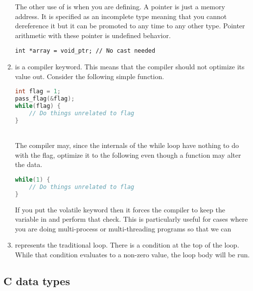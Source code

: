 \begin{enumerate}
	      The other use of  is when you are defining. A  pointer is just a memory address. It is specified as an incomplete type meaning that you cannot dereference it but it can be promoted to any time to any other type. Pointer arithmetic with these pointer is undefined behavior.

	      \begin{lstlisting}[langauge=C]
int *array = void_ptr; // No cast needed
\end{lstlisting}

	\item {} is a compiler keyword. This means that the compiler should not optimize its value out. Consider the following simple function.
	      \\
	      \begin{lstlisting}[language=C]
int flag = 1;
pass_flag(&flag);
while(flag) {
    // Do things unrelated to flag
}
\end{lstlisting}
	      \\
	      The compiler may, since the internals of the while loop have nothing to do with the flag, optimize it to the following even though a function may alter the data.
	      \\
	      \begin{lstlisting}[language=C]
while(1) {
    // Do things unrelated to flag
}
\end{lstlisting}
	      If you put the volatile keyword then it forces the compiler to keep the variable in and perform that check. This is particularly useful for cases where you are doing multi-process or multi-threading programs so that we can
	\item {} represents the traditional  loop. There is a condition at the top of the loop. While that condition evaluates to a non-zero value, the loop body will be run.
\end{enumerate}

\subsection{C data types}

